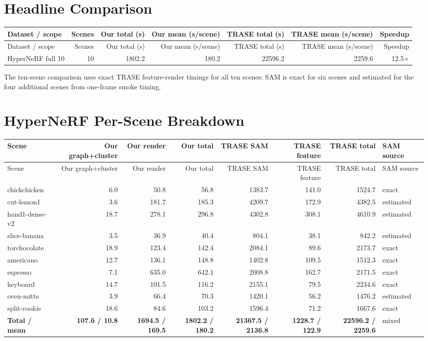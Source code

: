\documentclass[10pt]{article}
\begin{document}
\section{Headline Comparison}
\small
\begin{longtable}{lrrrrrr}
\toprule
Dataset / scope & Scenes & Our total (s) & Our mean (s/scene) & TRASE total (s) & TRASE mean (s/scene) & Speedup \\
\midrule
\endfirsthead
\toprule
Dataset / scope & Scenes & Our total (s) & Our mean (s/scene) & TRASE total (s) & TRASE mean (s/scene) & Speedup \\
\midrule
\endhead
HyperNeRF full 10 & 10 & 1802.2 & 180.2 & 22596.2 & 2259.6 & 12.5$\times$ \\
\bottomrule
\end{longtable}
\normalsize

The ten-scene comparison uses exact TRASE feature-render timings for all ten scenes; SAM is exact for six scenes and estimated for the four additional scenes from one-frame smoke timing.

\section{HyperNeRF Per-Scene Breakdown}
\small
\begin{longtable}{lrrrrrrl}
\toprule
Scene & Our graph+cluster & Our render & Our total & TRASE SAM & TRASE feature & TRASE total & SAM source \\
\midrule
\endfirsthead
\toprule
Scene & Our graph+cluster & Our render & Our total & TRASE SAM & TRASE feature & TRASE total & SAM source \\
\midrule
\endhead
chickchicken & 6.0 & 50.8 & 56.8 & 1383.7 & 141.0 & 1524.7 & exact \\
cut-lemon1 & 3.6 & 181.7 & 185.3 & 4209.7 & 172.9 & 4382.5 & estimated \\
hand1-dense-v2 & 18.7 & 278.1 & 296.8 & 4302.8 & 308.1 & 4610.9 & estimated \\
slice-banana & 3.5 & 36.9 & 40.4 & 804.1 & 38.1 & 842.2 & estimated \\
torchocolate & 18.9 & 123.4 & 142.4 & 2084.1 & 89.6 & 2173.7 & exact \\
americano & 12.7 & 136.1 & 148.8 & 1402.8 & 109.5 & 1512.3 & exact \\
espresso & 7.1 & 635.0 & 642.1 & 2008.8 & 162.7 & 2171.5 & exact \\
keyboard & 14.7 & 101.5 & 116.2 & 2155.1 & 79.5 & 2234.6 & exact \\
oven-mitts & 3.9 & 66.4 & 70.3 & 1420.1 & 56.2 & 1476.2 & estimated \\
split-cookie & 18.6 & 84.6 & 103.2 & 1596.4 & 71.2 & 1667.6 & exact \\
\midrule
\textbf{Total / mean} & \textbf{107.6 / 10.8} & \textbf{1694.5 / 169.5} & \textbf{1802.2 / 180.2} & \textbf{21367.5 / 2136.8} & \textbf{1228.7 / 122.9} & \textbf{22596.2 / 2259.6} & mixed \\
\bottomrule
\end{longtable}
\normalsize
\end{document}
